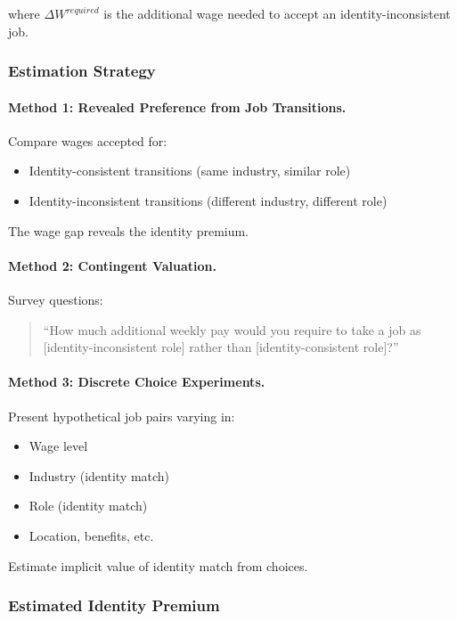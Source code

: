 where $\Delta W^{required}$ is the additional wage needed to accept 
an identity-inconsistent job.

\subsubsection{Estimation Strategy}

\paragraph{Method 1: Revealed Preference from Job Transitions.}

Compare wages accepted for:
\begin{itemize}
    \item Identity-consistent transitions (same industry, similar role)
    \item Identity-inconsistent transitions (different industry, different role)
\end{itemize}

The wage gap reveals the identity premium.

\paragraph{Method 2: Contingent Valuation.}

Survey questions:
\begin{quote}
``How much additional weekly pay would you require to take a job as 
[identity-inconsistent role] rather than [identity-consistent role]?''
\end{quote}

\paragraph{Method 3: Discrete Choice Experiments.}

Present hypothetical job pairs varying in:
\begin{itemize}
    \item Wage level
    \item Industry (identity match)
    \item Role (identity match)
    \item Location, benefits, etc.
\end{itemize}

Estimate implicit value of identity match from choices.

\subsubsection{Estimated Identity Premium}

